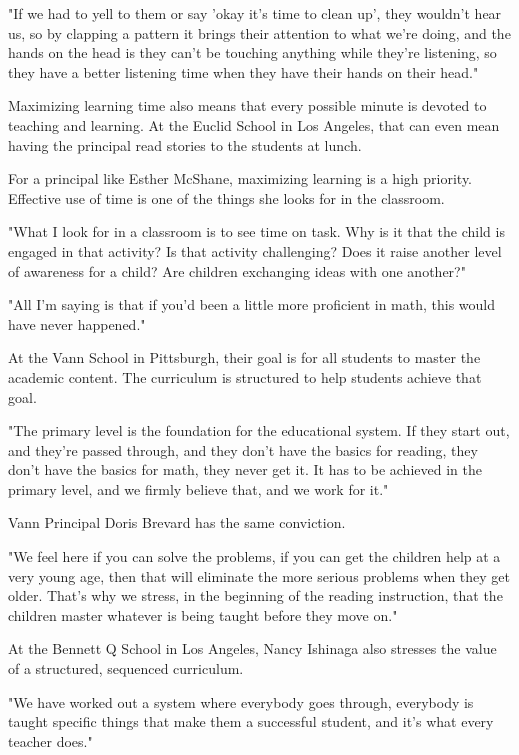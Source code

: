 "If we had to yell to them or say 'okay it's time to clean up', they wouldn't hear us, so by clapping a pattern it brings their attention to what we're doing, and the hands on the head is they can't be touching anything while they're listening, so they have a better listening time when they have their hands on their head."

Maximizing learning time also means that every possible minute is devoted to teaching and learning. At the Euclid School in Los Angeles, that can even mean having the principal read stories to the students at lunch.

For a principal like Esther McShane, maximizing learning is a high priority. Effective use of time is one of the things she looks for in the classroom.

"What I look for in a classroom is to see time on task. Why is it that the child is engaged in that activity? Is that activity challenging? Does it raise another level of awareness for a child? Are children exchanging ideas with one another?"

"All I'm saying is that if you'd been a little more proficient in math, this would have never happened."

At the Vann School in Pittsburgh, their goal is for all students to master the academic content. The curriculum is structured to help students achieve that goal.

"The primary level is the foundation for the educational system. If they start out, and they're passed through, and they don't have the basics for reading, they don't have the basics for math, they never get it. It has to be achieved in the primary level, and we firmly believe that, and we work for it."

Vann Principal Doris Brevard has the same conviction.

"We feel here if you can solve the problems, if you can get the children help at a very young age, then that will eliminate the more serious problems when they get older. That's why we stress, in the beginning of the reading instruction, that the children master whatever is being taught before they move on."

At the Bennett Q School in Los Angeles, Nancy Ishinaga also stresses the value of a structured, sequenced curriculum.

"We have worked out a system where everybody goes through, everybody is taught specific things that make them a successful student, and it's what every teacher does."

